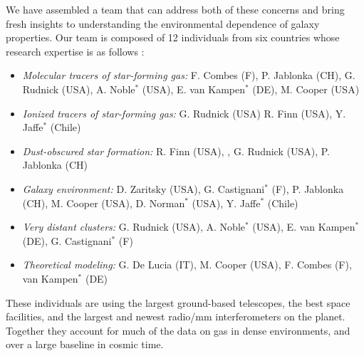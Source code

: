 \documentclass[11pt]{article}
\begin{document}

We have assembled a team that can address both of these concerns and bring fresh insights to understanding the environmental dependence of galaxy properties. Our team is composed of 12 individuals from six countries whose research expertise is as follows :
\vspace{-0.1in}
\begin{itemize} 
\item \textit{Molecular tracers of star-forming gas:} F. Combes (F), P. Jablonka (CH), G. Rudnick (USA),
A. Noble$^*$ (USA), E. van Kampen$^*$ (DE), M. Cooper (USA)
\vspace{-0.1in}
\item \textit{Ionized tracers of star-forming gas:} G. Rudnick (USA) R. Finn (USA), Y. Jaffe$^*$ (Chile) 
\vspace{-0.1in}
\item \textit{Dust-obscured star formation:} R. Finn (USA), , G. Rudnick (USA), P. Jablonka (CH)
\vspace{-0.1in}
\item \textit{Galaxy environment:} D. Zaritsky (USA), G. Castignani$^*$ (F), P. Jablonka (CH), M. Cooper (USA), D. Norman$^*$ (USA), Y. Jaffe$^*$ (Chile)
\vspace{-0.1in}
\item \textit{Very distant clusters:} G. Rudnick (USA), A. Noble$^*$ (USA), E. van Kampen$^*$ (DE), G. Castignani$^*$ (F) 
\vspace{-0.1in}
\item \textit{Theoretical modeling:} G. De Lucia (IT), M. Cooper (USA), F. Combes (F), van Kampen$^*$ (DE)
\end{itemize}
These individuals are using the largest ground-based telescopes, the best space facilities, and the largest and newest radio/mm interferometers on the planet.  Together they account for much of the data on gas in dense environments, and over a large baseline in cosmic time.  
\end{document}
